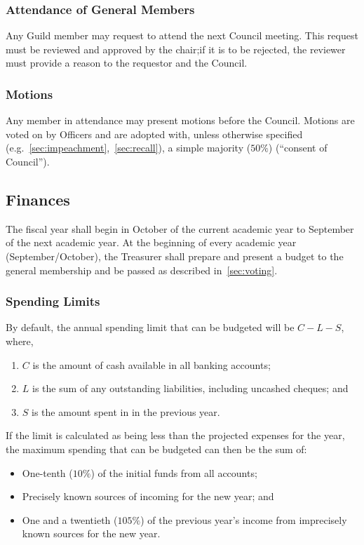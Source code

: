 \subsubsection{Attendance of General Members}
Any Guild member may request to attend the next Council meeting. This request
must be reviewed and approved by the chair;\@ if it is to be rejected, the
reviewer must provide a reason to the requestor and the Council.

\subsubsection{Motions}
Any member in attendance may present motions before the Council. Motions are
voted on by Officers and are adopted with, unless otherwise specified
(e.g.~\ref{sec:impeachment},~\ref{sec:recall}), a simple majority ($50\%$)
(``consent of Council'').

\subsection{Finances}\label{sec:finances}
The fiscal year shall begin in October of the current academic year to
September of the next academic year. At the beginning of every academic year
(September/October), the Treasurer shall prepare and present a budget to the
general membership and be passed as described in~\ref{sec:voting}.

\subsubsection{Spending Limits}
By default, the annual spending limit that can be budgeted will be $C - L - S$,
where,
\begin{enumerate}
      \item $C$ is the amount of cash available in all banking accounts;
      \item $L$ is the sum of any outstanding liabilities, including uncashed cheques; and
      \item $S$ is the amount spent in in the previous year.
\end{enumerate}
If the limit is calculated as being less than the projected expenses for the year, the maximum spending that can be budgeted can then be the sum of:

\begin{itemize}
      \item One-tenth ($10\%$) of the initial funds from all accounts;
      \item Precisely known sources of incoming for the new year; and
      \item One and a twentieth ($105\%$) of the previous year's income from imprecisely
            known sources for the new year.
\end{itemize}

